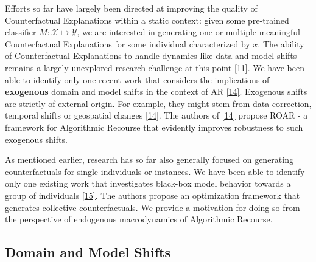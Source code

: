 \documentclass[
  conference]{IEEEtran}
\begin{document}
Efforts so far have largely been directed at improving the quality of
Counterfactual Explanations within a static context: given some
pre-trained classifier \(M: \mathcal{X} \mapsto \mathcal{Y}\), we are
interested in generating one or multiple meaningful Counterfactual
Explanations for some individual characterized by \(x\). The ability of
Counterfactual Explanations to handle dynamics like data and model
shifts remains a largely unexplored research challenge at this point
\protect\hyperlink{ref-verma2020counterfactual}{{[}11{]}}. We have been
able to identify only one recent work that considers the implications of
\textbf{exogenous} domain and model shifts in the context of AR
\protect\hyperlink{ref-upadhyay2021towards}{{[}14{]}}. Exogenous shifts
are strictly of external origin. For example, they might stem from data
correction, temporal shifts or geospatial changes
\protect\hyperlink{ref-upadhyay2021towards}{{[}14{]}}. The authors of
\protect\hyperlink{ref-upadhyay2021towards}{{[}14{]}} propose ROAR - a
framework for Algorithmic Recourse that evidently improves robustness to
such exogenous shifts.

As mentioned earlier, research has so far also generally focused on
generating counterfactuals for single individuals or instances. We have
been able to identify only one existing work that investigates black-box
model behavior towards a group of individuals
\protect\hyperlink{ref-carrizosa2021generating}{{[}15{]}}. The authors
propose an optimization framework that generates collective
counterfactuals. We provide a motivation for doing so from the
perspective of endogenous macrodynamics of Algorithmic Recourse.

\hypertarget{sec-related-shifts}{%
\subsection{Domain and Model Shifts}\label{sec-related-shifts}}
\end{document}
